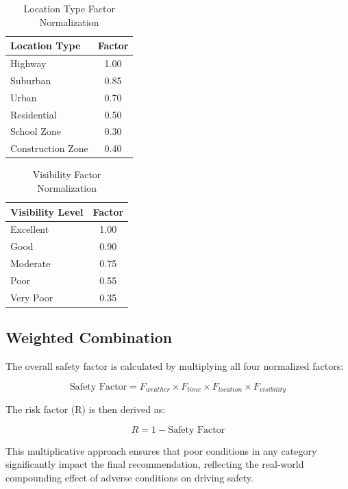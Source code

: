 \begin{table}[h]
\centering
\caption{Location Type Factor Normalization}
\label{tab:location}
\begin{tabular}{|l|c|}
\hline
\textbf{Location Type} & \textbf{Factor} \\
\hline
Highway & 1.00 \\
Suburban & 0.85 \\
Urban & 0.70 \\
Residential & 0.50 \\
School Zone & 0.30 \\
Construction Zone & 0.40 \\
\hline
\end{tabular}
\end{table}

\begin{table}[h]
\centering
\caption{Visibility Factor Normalization}
\label{tab:visibility}
\begin{tabular}{|l|c|}
\hline
\textbf{Visibility Level} & \textbf{Factor} \\
\hline
Excellent & 1.00 \\
Good & 0.90 \\
Moderate & 0.75 \\
Poor & 0.55 \\
Very Poor & 0.35 \\
\hline
\end{tabular}
\end{table}

\subsection{Weighted Combination}
The overall safety factor is calculated by multiplying all four normalized factors:

\begin{equation}
\text{Safety Factor} = F_{weather} \times F_{time} \times F_{location} \times F_{visibility}
\end{equation}

The risk factor (R) is then derived as:

\begin{equation}
R = 1 - \text{Safety Factor}
\end{equation}

This multiplicative approach ensures that poor conditions in any category significantly impact the final recommendation, reflecting the real-world compounding effect of adverse conditions on driving safety.

